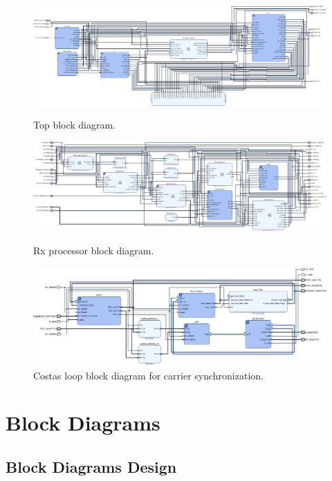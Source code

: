 \documentclass[journal,twoside]{IEEEtran}
\begin{document}
  \appendices

  \begin{figure}[!t]
    \includegraphics[width=\linewidth]{../schematic/top.pdf}
    \caption{Top block diagram.}
    \label{fig:block_top}
    \vspace*{.5em}
    \includegraphics[width=\linewidth]{../schematic/Rx.pdf}
    \caption{Rx processor block diagram.}
    \label{fig:block_rx}
    \includegraphics[width=\linewidth]{../schematic/costas_loop.pdf}
    \caption{Costas loop block diagram for carrier synchronization.}
    \label{fig:block_costas_looop}
  \end{figure}

  \section{Block Diagrams}\label{sec:block_diagrams}

    \subsection{Block Diagrams Design}
\end{document}
